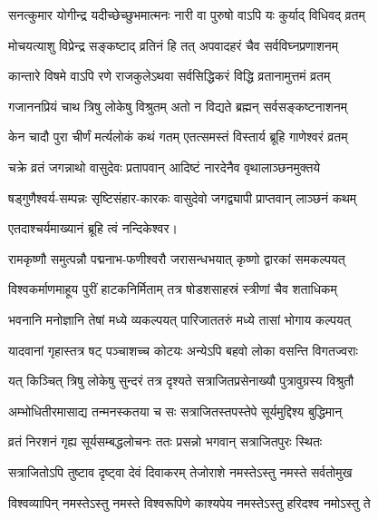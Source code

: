 \begin{center}
\twolineshloka
{सनत्कुमार योगीन्द्र यदीच्छेच्छुभमात्मनः}
{नारी वा पुरुषो वाऽपि यः कुर्याद् विधिवद् व्रतम्}%

\twolineshloka
{मोचयत्याशु विप्रेन्द्र सङ्कष्टाद् व्रतिनं हि तत्}
{अपवादहरं चैव सर्वविघ्नप्रणाशनम्}%

\twolineshloka
{कान्तारे विषमे वाऽपि रणे राजकुलेऽथवा}
{सर्वसिद्धिकरं विद्धि व्रतानामुत्तमं व्रतम्}%

\twolineshloka
{गजाननप्रियं चाथ त्रिषु लोकेषु विश्रुतम्}
{अतो न विद्यते ब्रह्मन् सर्वसङ्कष्टनाशनम्}%


\twolineshloka
{केन चादौ पुरा चीर्णं मर्त्यलोकं कथं गतम्}
{एतत्समस्तं विस्तार्य ब्रूहि गाणेश्वरं व्रतम्}%

\twolineshloka
{चक्रे व्रतं जगन्नाथो वासुदेवः प्रतापवान्}
{आदिष्टं नारदेनैव वृथालाञ्छनमुक्तये}%

\twolineshloka
{षड्गुणैश्वर्य-सम्पन्नः सृष्टिसंहार-कारकः} 
{वासुदेवो जगद्व्यापी प्राप्तवान् लाञ्छनं कथम्}%

एतदाश्चर्यमाख्यानं ब्रूहि त्वं नन्दिकेश्वर।


\twolineshloka
{रामकृष्णौ समुत्पन्नौ पद्मनाभ-फणीश्वरौ}
{जरासन्धभयात् कृष्णो द्वारकां समकल्पयत्}%

\twolineshloka
{विश्वकर्माणमाहूय पुरीं हाटकनिर्मिताम्}
{तत्र षोडशसाहस्रं स्त्रीणां चैव शताधिकम्}%

\twolineshloka
{भवनानि मनोज्ञानि तेषां मध्ये व्यकल्पयत्}
{पारिजाततरुं मध्ये तासां भोगाय कल्पयत्}%

\twolineshloka
{यादवानां गृहास्तत्र षट् पञ्चाशच्च कोटयः}
{अन्येऽपि बहवो लोका वसन्ति विगतज्वराः}%

\twolineshloka
{यत् किञ्चित् त्रिषु लोकेषु सुन्दरं तत्र दृश्यते}
{सत्राजितप्रसेनाख्यौ पुत्रावुग्रस्य विश्रुतौ}%

\twolineshloka
{अम्भोधितीरमासाद्य तन्मनस्कतया च सः}
{सत्राजितस्तपस्तेपे सूर्यमुद्दिश्य बुद्धिमान्}%

\twolineshloka
{व्रतं निरशनं गृह्य सूर्यसम्बद्धलोचनः}
{ततः प्रसन्नो भगवान् सत्राजितपुरः स्थितः}%

\twolineshloka
{सत्राजितोऽपि तुष्टाव दृष्ट्वा देवं दिवाकरम्}
{तेजोराशे नमस्तेऽस्तु नमस्ते सर्वतोमुख}%

\twolineshloka
{विश्वव्यापिन् नमस्तेऽस्तु नमस्ते विश्वरूपिणे}
{काश्यपेय नमस्तेऽस्तु हरिदश्व नमोऽस्तु ते}%


\end{center}
